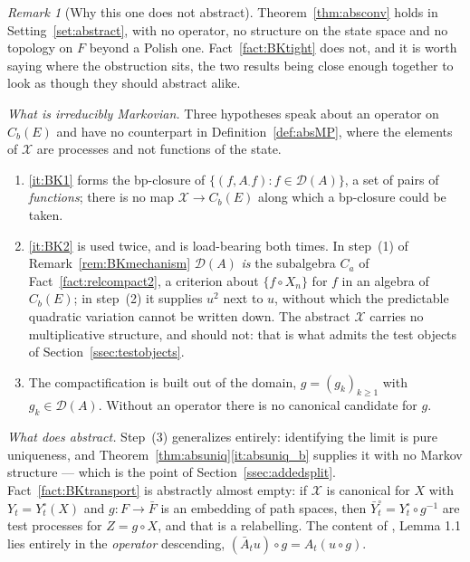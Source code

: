 \documentclass[11pt,a4paper]{article}
\theoremstyle{plain}
\theoremstyle{definition}
\theoremstyle{remark}
\newtheorem{remark}[theorem]{Remark}
\newcommand{\Cb}{C_b}                          %
\newcommand{\dom}{\mathcal{D}}                 %
\newcommand{\XX}{\mathcal{X}}                  %
\newcommand{\BK}{\cite{BK93}}
\begin{document}
\begin{remark}[Why this one does not abstract]
  \label{rem:BKnotabstract}
  Theorem~\ref{thm:absconv} holds in Setting~\ref{set:abstract}, with no operator,
  no structure on the state space and no topology on $F$ beyond a Polish one.
  Fact~\ref{fact:BKtight} does not, and it is worth saying where the obstruction
  sits, the two results being close enough together to look as though they should
  abstract alike.

  \emph{What is irreducibly Markovian.}  Three hypotheses speak about an operator
  on $\Cb(E)$ and have no counterpart in Definition~\ref{def:absMP}, where the
  elements of $\XX$ are processes and not functions of the state.
  \begin{enumerate}[label=(\arabic*)]
  \item \ref{it:BK1} forms the bp-closure of $\{(f,A_\cdot f) : f \in \dom(A)\}$,
    a set of pairs of \emph{functions}; there is no map $\XX \to \Cb(E)$ along
    which a bp-closure could be taken.
  \item \ref{it:BK2} is used twice, and is load-bearing both times.  In step~(1)
    of Remark~\ref{rem:BKmechanism} $\dom(A)$ \emph{is} the subalgebra $C_a$ of
    Fact~\ref{fact:relcompact2}, a criterion about $\{f \circ X_n\}$ for $f$ in an
    algebra of $\Cb(E)$; in step~(2) it supplies $u^2$ next to $u$, without which
    the predictable quadratic variation cannot be written down.  The abstract
    $\XX$ carries no multiplicative structure, and should not: that is what admits
    the test objects of Section~\ref{ssec:testobjects}.
  \item The compactification is built out of the domain,
    $g = (g_k)_{k \geq 1}$ with $g_k \in \dom(A)$.  Without an operator there is
    no canonical candidate for $g$.
  \end{enumerate}

  \emph{What does abstract.}  Step~(3) generalizes entirely: identifying the limit
  is pure uniqueness, and Theorem~\ref{thm:absuniq}\ref{it:absuniq_b} supplies it
  with no Markov structure --- which is the point of
  Section~\ref{ssec:addedsplit}.  Fact~\ref{fact:BKtransport} is abstractly almost
  empty: if $\XX$ is canonical for $X$ with $Y_t = Y^\circ_t(X)$ and
  $g : F \to \bar F$ is an embedding of path spaces, then
  $\bar Y^\circ_t = Y^\circ_t \circ g^{-1}$ are test processes for
  $Z = g \circ X$, and that is a relabelling.  The content of \BK, Lemma 1.1 lies
  entirely in the \emph{operator} descending,
  $(\bar A_t u) \circ g = A_t(u \circ g)$.


\end{remark}
\end{document}
